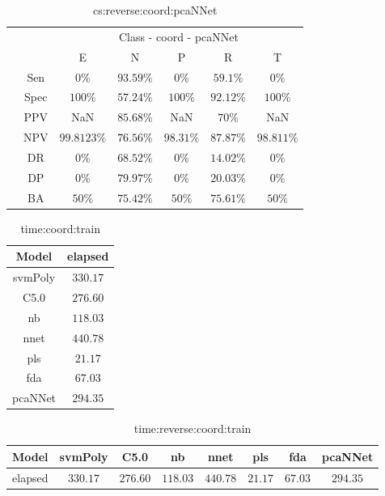 \begin{table}[!ht]
	\centering
	\begin{tabular}{|c|c|c|c|c|c|c|}
		\cline{3-7}
		\multicolumn{2}{c|}{} & \multicolumn{5}{c|}{Class - coord - pcaNNet} \\ \cline{3-7}
		\multicolumn{2}{c|}{} & E & N & P & R & T \\ \hline
		\multirow{7}{*}{\rotatebox{90}{Statistics}} & Sen & $0\%$ & $93.59\%$ & $0\%$ & $59.1\%$ & $0\%$ \\ \cline{2-7}
		 & Spec & $100\%$ & $57.24\%$ & $100\%$ & $92.12\%$ & $100\%$ \\ \cline{2-7}
		 & PPV & NaN & $85.68\%$ & NaN & $70\%$ & NaN \\ \cline{2-7}
		 & NPV & $99.8123\%$ & $76.56\%$ & $98.31\%$ & $87.87\%$ & $98.811\%$ \\ \cline{2-7}
		 & DR & $0\%$ & $68.52\%$ & $0\%$ & $14.02\%$ & $0\%$ \\ \cline{2-7}
		 & DP & $0\%$ & $79.97\%$ & $0\%$ & $20.03\%$ & $0\%$ \\ \cline{2-7}
		 & BA & $50\%$ & $75.42\%$ & $50\%$ & $75.61\%$ & $50\%$ \\ \hline
	\end{tabular}
	\caption{cs:reverse:coord:pcaNNet}
	\label{tab:cs:reverse:coord:pcaNNet}
\end{table}

\begin{table}[!ht]
	\centering
	\begin{tabular}{|c|c|}
		\hline
		Model & elapsed \\ \hline
		svmPoly & $330.17$ \\ \hline
		C5.0 & $276.60$ \\ \hline
		nb & $118.03$ \\ \hline
		nnet & $440.78$ \\ \hline
		pls & $21.17$ \\ \hline
		fda & $67.03$ \\ \hline
		pcaNNet & $294.35$ \\ \hline
	\end{tabular}
	\caption{time:coord:train}
	\label{tab:time:coord:train}
\end{table}

\begin{table}[!ht]
	\centering
	\begin{tabular}{|c|c|c|c|c|c|c|c|}
		\hline
		Model & svmPoly & C5.0 & nb & nnet & pls & fda & pcaNNet \\ \hline
		elapsed & $330.17$ & $276.60$ & $118.03$ & $440.78$ & $21.17$ & $67.03$ & $294.35$ \\ \hline
	\end{tabular}
	\caption{time:reverse:coord:train}
	\label{tab:time:reverse:coord:train}
\end{table}


